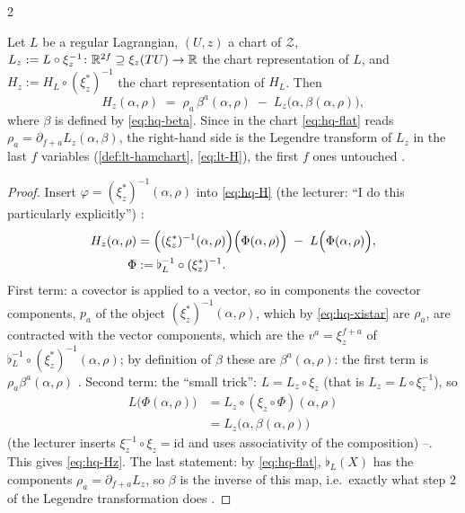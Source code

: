 \begin{paracol}{2}
\begin{theorem}\label{thm:hq-chart}
Let $L$ be a regular Lagrangian, $(U,z)$ a chart of $\mathcal Z$, $L_z:=L\circ\xi_z^{-1}\colon\mathbb{R}^{2f}\supseteq\xi_z(TU)\to\mathbb{R}$ the chart representation of $L$, and $H_z:=H_L\circ(\xi^*_z)^{-1}$ the chart representation of $H_L$. Then
\begin{equation}\label{eq:hq-Hz}
  H_z(\alpha,\rho)\;=\;\rho_a\,\beta^a(\alpha,\rho)\;-\;L_z\bigl(\alpha,\beta(\alpha,\rho)\bigr),
\end{equation}
where $\beta$ is defined by \eqref{eq:hq-beta}. Since in the chart \eqref{eq:hq-flat} reads $\rho_a=\partial_{f+a}L_z(\alpha,\beta)$, the right-hand side is the Legendre transform of $L_z$ in the last $f$ variables (\cref{def:lt-hamchart}, \eqref{eq:lt-H}), the first $f$ ones untouched .
\end{theorem}
\begin{proof}
Insert $\varphi=(\xi^*_z)^{-1}(\alpha,\rho)$ into \eqref{eq:hq-H} (the lecturer: ``I do this particularly explicitly'') :
\[
  \begin{aligned}
  H_z(\alpha,\rho)&=\Bigl((\xi^*_z)^{-1}(\alpha,\rho)\Bigr)\Bigl(\Phi(\alpha,\rho)\Bigr)\;-\;L\Bigl(\Phi(\alpha,\rho)\Bigr),\\
  \Phi&:=\flat_L^{-1}\circ(\xi^*_z)^{-1}.
  \end{aligned}
\]
First term: a covector is applied to a vector, so in components the covector components, $p_a$ of the object $(\xi^*_z)^{-1}(\alpha,\rho)$, which by \eqref{eq:hq-xistar} are $\rho_a$, are contracted with the vector components, which are the $v^a=\xi_z^{f+a}$ of $\flat_L^{-1}\circ(\xi^*_z)^{-1}(\alpha,\rho)$; by definition of $\beta$ these are $\beta^a(\alpha,\rho)$: the first term is $\rho_a\beta^a(\alpha,\rho)$ . Second term: the ``small trick'': $L=L_z\circ\xi_z$ (that is $L_z=L\circ\xi_z^{-1}$), so
\[
  \begin{aligned}
  L\bigl(\Phi(\alpha,\rho)\bigr)&=L_z\circ(\xi_z\circ\Phi)(\alpha,\rho)\\
  &=L_z\bigl(\alpha,\beta(\alpha,\rho)\bigr)
  \end{aligned}
\]
(the lecturer inserts $\xi_z^{-1}\circ\xi_z=\mathrm{id}$ and uses associativity of the composition) --. This gives \eqref{eq:hq-Hz}. The last statement: by \eqref{eq:hq-flat}, $\flat_L(X)$ has the components $\rho_a=\partial_{f+a}L_z$, so $\beta$ is the inverse of this map, i.e.\ exactly what step 2 of the Legendre transformation does . \qedhere

\end{proof}
\end{paracol}
